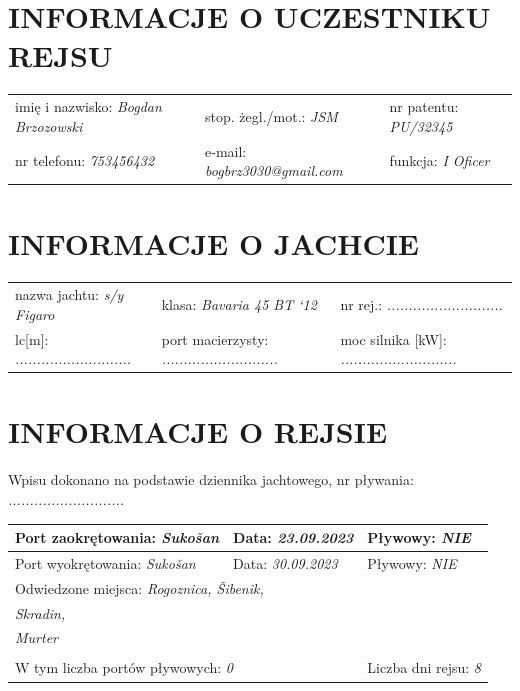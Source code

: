 \documentclass{article}
\begin{document}
\section*{INFORMACJE O UCZESTNIKU REJSU}
\begin{tabularx}{\textwidth}{X X X}
imię i nazwisko: \textit{Bogdan Brzozowski} & stop. żegl./mot.: \textit{JSM} & nr patentu: \textit{PU/32345} \\
nr telefonu: \textit{753456432} & e-mail: \textit{bogbrz3030@gmail.com} & funkcja: \textit{I Oficer} \\
\end{tabularx}

\section*{INFORMACJE O JACHCIE}

\begin{tabularx}{\textwidth}{X X X}
nazwa jachtu: \textit{s/y Figaro} & klasa: \textit{Bavaria 45 BT ‘12} & nr rej.: \textit{...........................} \\
lc[m]: \textit{...........................} & port macierzysty: \textit{...........................} & moc silnika [kW]: \textit{...........................} \\
\end{tabularx}

\section*{INFORMACJE O REJSIE}

Wpisu dokonano na podstawie dziennika jachtowego, nr pływania: \textit{...........................}
\\

\begin{tabularx}{\textwidth}{|X|X|X|}
\hline
Port zaokrętowania: \textit{Sukošan} & Data: \textit{23.09.2023} & Pływowy: \textit{NIE} \\
\hline
Port wyokrętowania: \textit{Sukošan} & Data: \textit{30.09.2023} & Pływowy: \textit{NIE} \\
\hline
\multicolumn{3}{|l|}{Odwiedzone miejsca:
\textit{Rogoznica, Šibenik,}\dotfill}\\
\multicolumn{3}{|l|}{\textit{ Skradin,}\dotfill} \\
\multicolumn{3}{|l|}{\textit{ Murter}\dotfill} \\
\multicolumn{3}{|l|}{\dotfill} \\
\hline
\multicolumn{2}{|l|}{W tym liczba portów pływowych: \textit{0}} & Liczba dni rejsu: \textit{8}\\
\hline
\end{tabularx}
\\\\
\end{document}
